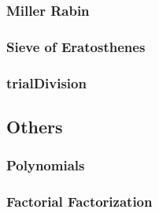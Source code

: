 \documentclass[../Notes/main.tex]{subfiles}
\begin{document}
\subsubsection{Miller Rabin}


\subsubsection{Sieve of Eratosthenes}


\subsubsection{trialDivision}


\subsection{Others}
\subsubsection{Polynomials}


\subsubsection{Factorial Factorization}

\end{document}
